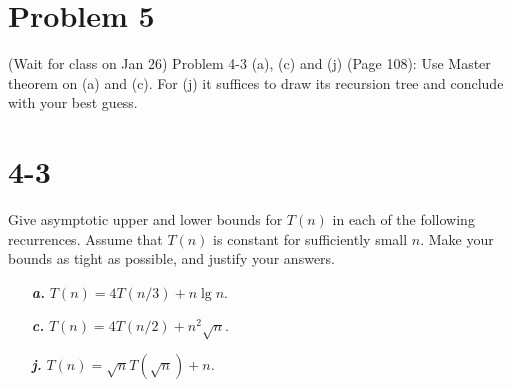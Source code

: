 \documentclass{../homework}
\begin{document}
\newpage
\section*{Problem 5}
\begin{tcolorbox}
    (Wait for class on Jan 26) Problem 4-3 (a), (c) and (j) (Page 108): Use Master theorem on (a) and (c). For (j) it suffices to draw its recursion tree and conclude with your best guess.
\end{tcolorbox}

\section*{4-3}
Give asymptotic upper and lower bounds for $T(n)$ in each of the following recurrences. Assume that $T(n)$ is constant for sufficiently small $n$. Make your bounds as tight as possible, and justify your answers.

\begin{itemize}
    \item[\textbf{\textit{a.}}] $T(n) = 4T(n/3) + n \lg{n}$.
    \item[\textbf{\textit{c.}}] $T(n) = 4T(n/2) + n^2 \sqrt{n}$.
    \item[\textbf{\textit{j.}}] $T(n) = \sqrt{n}T(\sqrt{n}) + n$.
\end{itemize}
\end{document}
